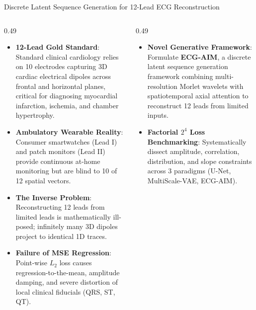 \documentclass[aspectratio=169,10pt]{beamer}
\begin{document}
\begin{frame}[t]{Discrete Latent Sequence Generation for 12-Lead ECG Reconstruction}
  \vspace{-2pt}
  \begin{columns}[T]
    \begin{column}{0.49\textwidth}
      \begin{tcolorbox}[cardstyle,colframe=NavyLight,top=1mm,bottom=1mm,left=2mm,right=2mm,title={\bfseries\fontsize{7.5}{9}\selectfont\color{Navy}Clinical Background \& Motivation}]
        \fontsize{6.2}{7.4}\selectfont
        \begin{itemize}\setlength{\itemsep}{0.5pt}\setlength{\parskip}{0pt}\setlength{\leftskip}{-10pt}
          \item \textbf{12-Lead Gold Standard}: Standard clinical cardiology relies on 10 electrodes capturing 3D cardiac electrical dipoles across frontal and horizontal planes, critical for diagnosing myocardial infarction, ischemia, and chamber hypertrophy.
          \item \textbf{Ambulatory Wearable Reality}: Consumer smartwatches (Lead I) and patch monitors (Lead II) provide continuous at-home monitoring but are blind to 10 of 12 spatial vectors.
          \item \textbf{The Inverse Problem}: Reconstructing 12 leads from limited leads is mathematically ill-posed; infinitely many 3D dipoles project to identical 1D traces.
          \item \textbf{Failure of MSE Regression}: Point-wise $L_2$ loss causes regression-to-the-mean, amplitude damping, and severe distortion of local clinical fiducials (QRS, ST, QT).
        \end{itemize}
      \end{tcolorbox}
    \end{column}
    \begin{column}{0.49\textwidth}
      \begin{tcolorbox}[cardstyle,colframe=SuccessGreen,top=1mm,bottom=1mm,left=2mm,right=2mm,title={\bfseries\fontsize{7.5}{9}\selectfont\color{SuccessGreen}Purpose of the Study}]
        \fontsize{6.2}{7.4}\selectfont
        \begin{itemize}\setlength{\itemsep}{0.5pt}\setlength{\parskip}{0pt}\setlength{\leftskip}{-10pt}
          \item \textbf{Novel Generative Framework}: Formulate \textbf{ECG-AIM}, a discrete latent sequence generation framework combining multi-resolution Morlet wavelets with spatiotemporal axial attention to reconstruct 12 leads from limited inputs.
          \item \textbf{Factorial $2^4$ Loss Benchmarking}: Systematically dissect amplitude, correlation, distribution, and slope constraints across 3 paradigms (U-Net, MultiScale-VAE, ECG-AIM).

\end{itemize}
\end{tcolorbox}
\end{column}
\end{columns}
\end{frame}
\end{document}

